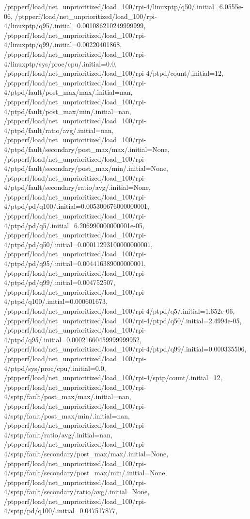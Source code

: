 {    /ptpperf/load/net_unprioritized/load_100/rpi-4/linuxptp/q50/.initial=6.0555e-06,
    /ptpperf/load/net_unprioritized/load_100/rpi-4/linuxptp/q95/.initial=0.001086210249999999,
    /ptpperf/load/net_unprioritized/load_100/rpi-4/linuxptp/q99/.initial=0.00220401868,
    /ptpperf/load/net_unprioritized/load_100/rpi-4/linuxptp/sys/proc/cpu/.initial=0.0,
    /ptpperf/load/net_unprioritized/load_100/rpi-4/ptpd/count/.initial=12,
    /ptpperf/load/net_unprioritized/load_100/rpi-4/ptpd/fault/post_max/max/.initial=nan,
    /ptpperf/load/net_unprioritized/load_100/rpi-4/ptpd/fault/post_max/min/.initial=nan,
    /ptpperf/load/net_unprioritized/load_100/rpi-4/ptpd/fault/ratio/avg/.initial=nan,
    /ptpperf/load/net_unprioritized/load_100/rpi-4/ptpd/fault/secondary/post_max/max/.initial=None,
    /ptpperf/load/net_unprioritized/load_100/rpi-4/ptpd/fault/secondary/post_max/min/.initial=None,
    /ptpperf/load/net_unprioritized/load_100/rpi-4/ptpd/fault/secondary/ratio/avg/.initial=None,
    /ptpperf/load/net_unprioritized/load_100/rpi-4/ptpd/pd/q100/.initial=0.005300676000000001,
    /ptpperf/load/net_unprioritized/load_100/rpi-4/ptpd/pd/q5/.initial=6.206990000000001e-05,
    /ptpperf/load/net_unprioritized/load_100/rpi-4/ptpd/pd/q50/.initial=0.00011293100000000001,
    /ptpperf/load/net_unprioritized/load_100/rpi-4/ptpd/pd/q95/.initial=0.004416389000000001,
    /ptpperf/load/net_unprioritized/load_100/rpi-4/ptpd/pd/q99/.initial=0.004752507,
    /ptpperf/load/net_unprioritized/load_100/rpi-4/ptpd/q100/.initial=0.000601673,
    /ptpperf/load/net_unprioritized/load_100/rpi-4/ptpd/q5/.initial=1.652e-06,
    /ptpperf/load/net_unprioritized/load_100/rpi-4/ptpd/q50/.initial=2.4994e-05,
    /ptpperf/load/net_unprioritized/load_100/rpi-4/ptpd/q95/.initial=0.00021660459999999952,
    /ptpperf/load/net_unprioritized/load_100/rpi-4/ptpd/q99/.initial=0.000335506,
    /ptpperf/load/net_unprioritized/load_100/rpi-4/ptpd/sys/proc/cpu/.initial=0.0,
    /ptpperf/load/net_unprioritized/load_100/rpi-4/sptp/count/.initial=12,
    /ptpperf/load/net_unprioritized/load_100/rpi-4/sptp/fault/post_max/max/.initial=nan,
    /ptpperf/load/net_unprioritized/load_100/rpi-4/sptp/fault/post_max/min/.initial=nan,
    /ptpperf/load/net_unprioritized/load_100/rpi-4/sptp/fault/ratio/avg/.initial=nan,
    /ptpperf/load/net_unprioritized/load_100/rpi-4/sptp/fault/secondary/post_max/max/.initial=None,
    /ptpperf/load/net_unprioritized/load_100/rpi-4/sptp/fault/secondary/post_max/min/.initial=None,
    /ptpperf/load/net_unprioritized/load_100/rpi-4/sptp/fault/secondary/ratio/avg/.initial=None,
    /ptpperf/load/net_unprioritized/load_100/rpi-4/sptp/pd/q100/.initial=0.047517877,
}
